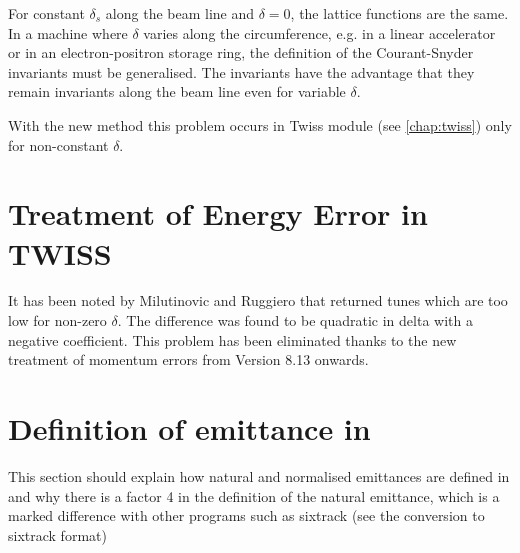 For constant $\delta_s$ along the beam line and $\delta = 0$, the
lattice functions are the same. In a machine where $\delta$ varies along
the circumference, e.g. in a linear accelerator or in an
electron-positron storage ring, the definition of the Courant-Snyder
invariants must be generalised. The \madeight invariants have the advantage
that they remain invariants along the beam line even for variable $\delta$.  

With the new method this problem occurs in Twiss module (see
\ref{chap:twiss}) only for non-constant $\delta$.    

\section{Treatment of Energy Error in TWISS} 
\label{sec:twiss_energy_error}
It has been noted by Milutinovic and Ruggiero \cite{milutinovic1988}
that \madeight returned tunes which are too low for non-zero
$\delta$. The difference was found to be quadratic in delta with a negative
coefficient. This problem has been eliminated thanks to the new
treatment  of momentum errors from \madeight Version 8.13 onwards.   

\section{Definition of emittance in \madx}
\label{sec:emittance_definition}
This section should explain how natural and normalised emittances are
defined in \madx and why there is a factor 4 in the definition of the
natural emittance, which is a marked difference with other programs such
as sixtrack (see the conversion to sixtrack format)


